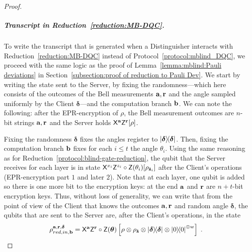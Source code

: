 \begin{proof}
    \subparagraph{Transcript in Reduction~\ref{reduction:MB-DQC}.}
To write the transcript that is generated when a Distinguisher interacts with Reduction~\ref{reduction:MB-DQC} instead of Protocol~\ref{protocol:mblind_DQC}, we proceed with the same logic as the proof of Lemma~\ref{lemma:mblind:Pauli deviations} in Section~\ref{subsection:proof of reduction to Pauli Dev}. We start by writing the state sent to the Server, by fixing the randomness—which here consists of the outcomes of the Bell measurements $\mathbf a, \mathbf r$ and the angle sampled uniformly by the Client $\boldsymbol\delta$—and the computation branch $\mathbf b$. We can note the following: after the EPR-encryption of $\rho$, the Bell measurement outcomes are $n$-bit strings $\mathbf a, \mathbf r$ and the Server holds $\mathsf{X}^{\mathbf a}\mathsf{Z}^{\mathbf r}[\rho]$.

    Fixing the randomness $\boldsymbol{\delta}$ fixes the angles register to $\ketbra{\boldsymbol{\delta}}$. Then, fixing the computation branch $\mathbf b$ fixes for each $i\leq t$ the angle $\theta_i$. Using the same reasoning as for Reduction~\ref{protocol:blind-gate-reduction}, the qubit that the Server receives for each layer is in state $\mathsf{X}^{x_i}\mathsf{Z}^{z_i}\circ\mathsf{Z}(\theta_i)[\rho_{\mathtt{A}_i}]$ after the Client's operations (EPR-encryption part $1$ and later $2$).
    Note that at each layer, one qubit is added so there is one more bit to the encryption keys: at the end $\mathbf a$ and $\mathbf r$ are $n+t$-bit encryption keys.
    Thus, without loss of generality, we can write that from the point of view of the Client that knows the outcomes $\mathbf a, \mathbf r$ and random angle $\boldsymbol{\delta}$, the qubits that are sent to the Server are, after the Client's operations, in the state
    \begin{equation}
        \rho_{red, in, \mathbf b}^{\mathbf a, \mathbf r, \boldsymbol{\delta}}
        =
        \mathsf{X}^{\mathbf a}\mathsf{Z}^{\mathbf r}
            \circ
            \mathsf{Z}(\boldsymbol\theta)
            \left[\rho
            \otimes
            \rho_{\mathtt{A}}
            \otimes
            \ketbra{\boldsymbol\delta}
            \otimes
            \ketbra{0}^{\otimes w}\right]\; .
    \end{equation}


\end{proof}
